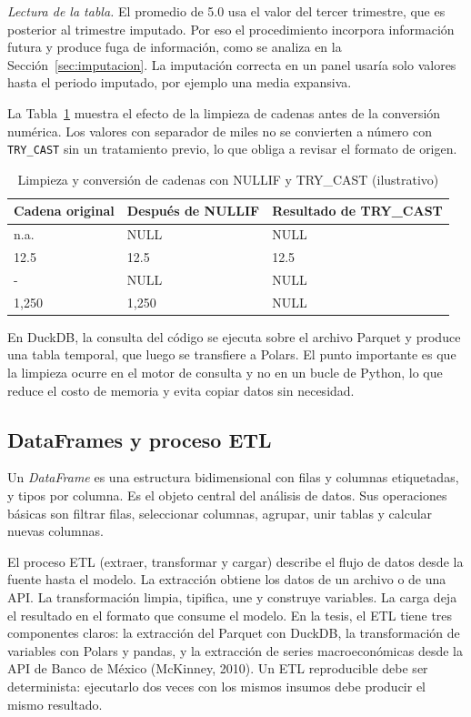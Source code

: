 \textit{Lectura de la tabla.} El promedio de 5.0 usa el valor del tercer trimestre, que es posterior al trimestre imputado. Por eso el procedimiento incorpora información futura y produce fuga de información, como se analiza en la Sección~\ref{sec:imputacion}. La imputación correcta en un panel usaría solo valores hasta el periodo imputado, por ejemplo una media expansiva.

La Tabla~\ref{tab:trycast} muestra el efecto de la limpieza de cadenas antes de la conversión numérica. Los valores con separador de miles no se convierten a número con \texttt{TRY\_CAST} sin un tratamiento previo, lo que obliga a revisar el formato de origen.

\begin{table}[htbp]
\centering
\small
\caption{Limpieza y conversión de cadenas con NULLIF y TRY\_CAST (ilustrativo)}
\label{tab:trycast}
\begin{tabular}{lll}
\toprule
Cadena original & Después de NULLIF & Resultado de TRY\_CAST \\
\midrule
n.a. & NULL & NULL \\
12.5 & 12.5 & 12.5 \\
- & NULL & NULL \\
1,250 & 1,250 & NULL \\
\bottomrule
\end{tabular}
\end{table}

En DuckDB, la consulta del código se ejecuta sobre el archivo Parquet y produce una tabla temporal, que luego se transfiere a Polars. El punto importante es que la limpieza ocurre en el motor de consulta y no en un bucle de Python, lo que reduce el costo de memoria y evita copiar datos sin necesidad.

\subsection{DataFrames y proceso ETL}
Un \textit{DataFrame} es una estructura bidimensional con filas y columnas etiquetadas, y tipos por columna. Es el objeto central del análisis de datos. Sus operaciones básicas son filtrar filas, seleccionar columnas, agrupar, unir tablas y calcular nuevas columnas.

El proceso ETL (extraer, transformar y cargar) describe el flujo de datos desde la fuente hasta el modelo. La extracción obtiene los datos de un archivo o de una API. La transformación limpia, tipifica, une y construye variables. La carga deja el resultado en el formato que consume el modelo. En la tesis, el ETL tiene tres componentes claros: la extracción del Parquet con DuckDB, la transformación de variables con Polars y pandas, y la extracción de series macroeconómicas desde la API de Banco de México (McKinney, 2010). Un ETL reproducible debe ser determinista: ejecutarlo dos veces con los mismos insumos debe producir el mismo resultado.


